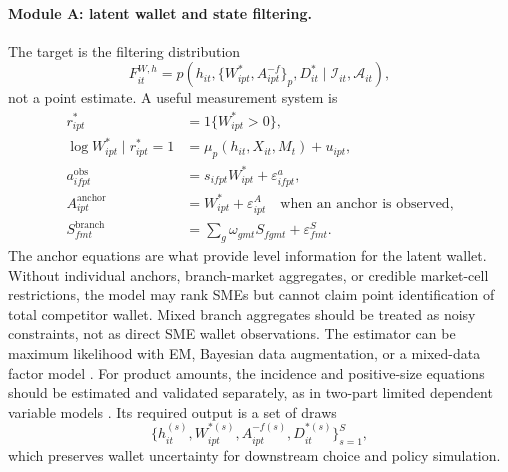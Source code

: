 \documentclass[11pt]{article}
\begin{document}
\paragraph{Module A: latent wallet and state filtering.}
The target is the filtering distribution
\[
  F_{it}^{W,h}
  =
  p(h_{it},\{W_{ipt}^{*},A_{ipt}^{-f}\}_p,D_{it}^{*}
  \mid \mathcal{I}_{it},\mathcal{A}_{it}),
\]
not a point estimate. A useful measurement system is
\[
\begin{aligned}
  r_{ipt}^{*} &= 1\{W_{ipt}^{*}>0\},\\
  \log W_{ipt}^{*}\mid r_{ipt}^{*}=1
    &= \mu_p(h_{it},X_{it},M_t)+u_{ipt},\\
  a_{ifpt}^{\mathrm{obs}}
    &= s_{ifpt}W_{ipt}^{*}+\varepsilon_{ifpt}^{a},\\
  A_{ipt}^{\mathrm{anchor}}
    &= W_{ipt}^{*}+\varepsilon_{ipt}^{A}
    \quad \text{when an anchor is observed,}\\
  S_{fmt}^{\mathrm{branch}}
    &= \sum_g \omega_{gmt}S_{fgmt}+\varepsilon_{fmt}^{S}.
\end{aligned}
\]
The anchor equations are what provide level information for the latent wallet.
Without individual anchors, branch-market aggregates, or credible market-cell
restrictions, the model may rank SMEs but cannot claim point identification of
total competitor wallet. Mixed branch aggregates should be treated as noisy
constraints, not as direct SME wallet observations. The
estimator can be maximum likelihood with EM, Bayesian data augmentation, or a
mixed-data factor model
\citep{kamakura1991latent,kamakura2003database,dempster1977em}. For product
amounts, the incidence and positive-size equations should be estimated and
validated separately, as in two-part limited dependent variable models
\citep{cragg1971limited}. Its required output is a set of draws
\[
  \{h_{it}^{(s)},W_{ipt}^{*(s)},A_{ipt}^{-f(s)},D_{it}^{*(s)}\}_{s=1}^{S},
\]
which preserves wallet uncertainty for downstream choice and policy
simulation.
\end{document}
